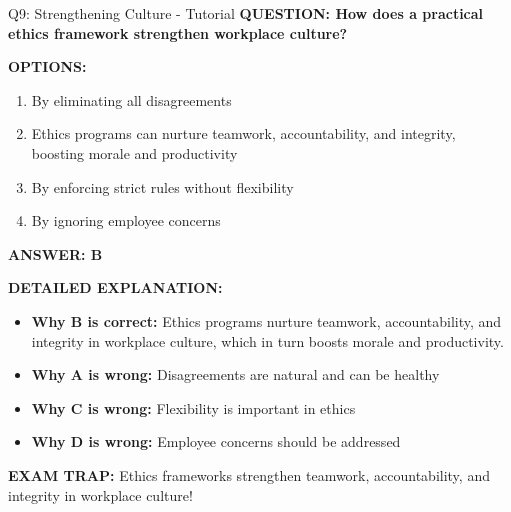 \documentclass[8pt]{beamer}
\begin{document}
	\begin{frame}{Q9: Strengthening Culture - Tutorial}
		\fontsize{6.5}{7.5}\selectfont
		\textbf{QUESTION: How does a practical ethics framework strengthen workplace culture?}
		
		\vspace{0.1cm}
		\textbf{OPTIONS:}
		\begin{enumerate}
			\item By eliminating all disagreements
			\item Ethics programs can nurture teamwork, accountability, and integrity, boosting morale and productivity
			\item By enforcing strict rules without flexibility
			\item By ignoring employee concerns
		\end{enumerate}
		
		\vspace{0.1cm}
		\textcolor{myblue}{\textbf{ANSWER: B}}
		
		\vspace{0.1cm}
		\textbf{DETAILED EXPLANATION:}
		\begin{itemize}
			\item \textbf{Why B is correct:} Ethics programs nurture teamwork, accountability, and integrity in workplace culture, which in turn boosts morale and productivity.
			\item \textbf{Why A is wrong:} Disagreements are natural and can be healthy
			\item \textbf{Why C is wrong:} Flexibility is important in ethics
			\item \textbf{Why D is wrong:} Employee concerns should be addressed
		\end{itemize}
		
		\textcolor{myred}{\textbf{EXAM TRAP:}} Ethics frameworks strengthen \textcolor{myblue}{teamwork, accountability, and integrity} in workplace culture!
	\end{frame}
	
\end{document}

